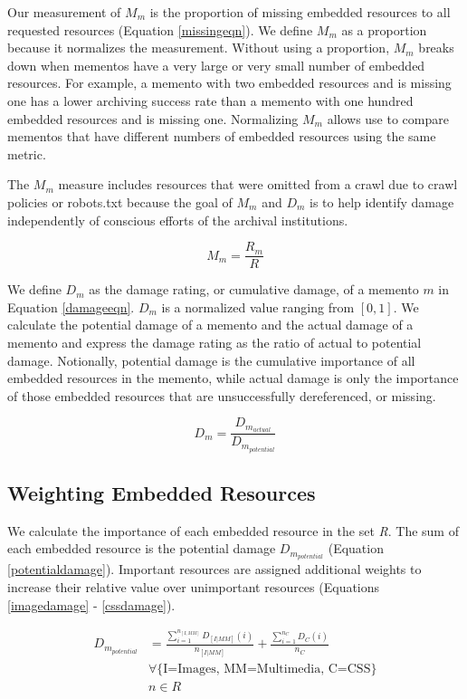 Our measurement of $M_m$ is the proportion of missing embedded resources to all requested resources (Equation \ref{missingeqn}). We define $M_m$ as a proportion because it normalizes the measurement. Without using a proportion, $M_m$ breaks down when mementos have a very large or very small number of embedded resources. For example, a memento with two embedded resources and is missing one has a lower archiving success rate than a memento with one hundred embedded resources and is missing one. Normalizing $M_m$ allows use to compare mementos that have different numbers of embedded resources using the same metric.

The $M_m$ measure includes resources that were omitted from a crawl due to crawl policies or robots.txt \cite{robotsProtocol} because the goal of $M_m$ and $D_m$ is to help identify damage independently of conscious efforts of the archival institutions. 

\begin{equation}
\label{missingeqn}
M_m = \frac{R_m}{R}
\end{equation}

We define $D_m$ as the damage rating, or cumulative damage, of a memento $m$ in Equation \ref{damageeqn}. $D_m$ is a normalized value ranging from $[0,1]$. We calculate the potential damage of a memento and the actual damage of a memento and express the damage rating as the ratio of actual to potential damage. Notionally, potential damage is the cumulative importance of all embedded resources in the memento, while actual damage is only the importance of those embedded resources that are unsuccessfully dereferenced, or missing. 

\begin{equation}
\label{damageeqn}
D_m = \frac{D_{m_{actual}}}{D_{m_{potential}}}
\end{equation}


\subsection{Weighting Embedded Resources}
We calculate the importance of each embedded resource in the set \emph{R}. The sum of each embedded resource is the potential damage \emph{$D_{m_{potential}}$} (Equation \ref{potentialdamage}). Important resources are assigned additional weights to increase their relative value over unimportant resources (Equations \ref{imagedamage} - \ref{cssdamage}).

\begin{equation}
\label{potentialdamage}
\begin{split}
D_{m_{potential}}& = \frac{\sum_{i=1}^{n_{[I,MM]}} D_{[I|MM]}(i)}{n_{[I|MM]}} +\frac{\sum_{i=1}^{n_C} D_C(i)}{n_C} %
\\&\forall\{\text{I=Images, MM=Multimedia, C=CSS}\}\\& n \in R
\end{split}
\end{equation}

